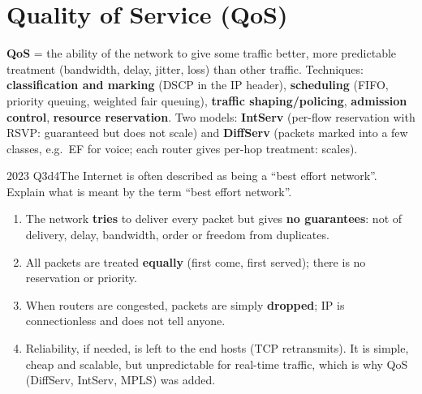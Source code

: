 \documentclass[10pt]{article}
\begin{document}
\section{Quality of Service (QoS)}

\textbf{QoS} = the ability of the network to give some traffic better, more predictable treatment (bandwidth, delay, jitter, loss) than other traffic.
Techniques: \textbf{classification and marking} (DSCP in the IP header), \textbf{scheduling} (FIFO, priority queuing, weighted fair queuing), \textbf{traffic shaping/policing}, \textbf{admission control}, \textbf{resource reservation}.
Two models: \textbf{IntServ} (per-flow reservation with RSVP: guaranteed but does not scale) and \textbf{DiffServ} (packets marked into a few classes, e.g.\ EF for voice; each router gives per-hop treatment: scales).

\begin{pastq}{2023 Q3d}{4}The Internet is often described as being a ``best effort network''. Explain what is meant by the term ``best effort network''.\end{pastq}
\begin{ans}
\begin{enumerate}
\item The network \textbf{tries} to deliver every packet but gives \textbf{no guarantees}: not of delivery, delay, bandwidth, order or freedom from duplicates.
\item All packets are treated \textbf{equally} (first come, first served); there is no reservation or priority.
\item When routers are congested, packets are simply \textbf{dropped}; IP is connectionless and does not tell anyone.
\item Reliability, if needed, is left to the end hosts (TCP retransmits). It is simple, cheap and scalable, but unpredictable for real-time traffic, which is why QoS (DiffServ, IntServ, MPLS) was added.
\end{enumerate}
\end{ans}
\end{document}

